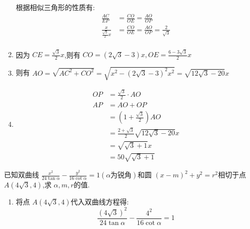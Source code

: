 \documentclass[answers]{exam}
\begin{document}
\begin{questions}
\begin{solution}
\begin{enumerate}[label=\zhnum{*}、, noitemsep]
			      根据相似三角形的性质有:
			      \begin{align*}
				      \frac{AC}{EP}                 & = \frac{CO}{OE} = \frac{AO}{OP}                     \\
				      \frac{x}{\frac{\sqrt{3}}{2}x} & = \frac{CO}{OE} = \frac{AO}{OP}= \frac{2}{\sqrt{3}} \\
			      \end{align*}
			\item 因为 \( CE=\frac{\sqrt{3}}{2}x \),则有 \( CO = (2\sqrt{3} - 3)x, OE = \frac{6 - 3\sqrt{3}}{2}x \)
			\item 则有 \( AO = \sqrt{AC^2 + CO^2} = \sqrt{x^2 - (2\sqrt{3} - 3)^2x^2} = \sqrt{12\sqrt{3} - 20}x \)
			\item
			      \begin{align*}
				      OP & = \frac{\sqrt{3}}{2} \cdot AO               \\
				      AP & = AO + OP                                   \\
				         & = (1+\frac{\sqrt{3}}{2})AO                  \\
				         & = \frac{2+\sqrt{3}}{2}\sqrt{12\sqrt{3}-20}x \\
				         & = \sqrt{\sqrt{3} + 1}x                      \\
				         & = 50\sqrt{\sqrt{3} + 1}
			      \end{align*}

		\end{enumerate}
	\end{solution}

	\question 已知双曲线 \( \frac{x^2}{24\tan\alpha} - \frac{y^2}{16\cot\alpha} = 1 (\alpha\text{为锐角})\)和圆 \( (x-m)^2 +
	y^2 = r^2 \)相切于点 \( A(4\sqrt{3},4) \),求 \( \alpha, m, r \)的值.
	\begin{solution}
		\begin{enumerate}[label=\arabic*., noitemsep]
			\item 将点 	\( A(4\sqrt{3}, 4) \)代入双曲线方程得:
			      \begin{equation*}
				      \frac{(4\sqrt{3})^2}{24\tan\alpha} - \frac{4^2}{16\cot\alpha} = 1
			      \end{equation*}


\end{enumerate}
\end{solution}
\end{questions}
\end{document}
